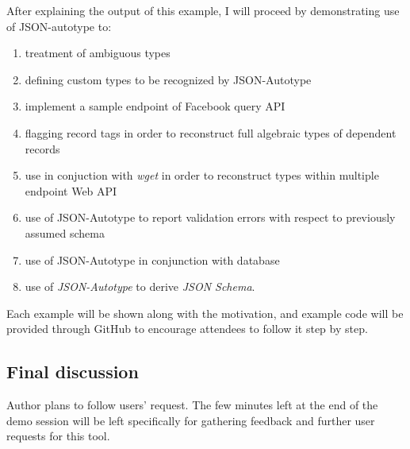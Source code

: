 \documentclass[11pt]{article}
\begin{document}
After explaining the output of this example, I will proceed by demonstrating use of JSON-autotype to:
\begin{enumerate}
\item treatment of ambiguous types
\item defining custom types to be recognized by JSON-Autotype
\item implement a sample endpoint of Facebook query API
\item flagging record tags in order to reconstruct full algebraic types of dependent records
\item use in conjuction with \emph{wget} in order to reconstruct types within multiple endpoint Web API
\item use of JSON-Autotype to report validation errors with respect to previously assumed schema
\item use of JSON-Autotype in conjunction with database
\item use of \emph{JSON-Autotype} to derive \emph{JSON Schema}.
\end{enumerate}

Each example will be shown along with the motivation, and example code will be provided through GitHub to encourage attendees to follow it step by step.

\subsection*{Final discussion}
Author plans to follow users' request. The few minutes left at the end of the demo session will be left specifically for gathering feedback and further user requests for this tool.

\end{document}
